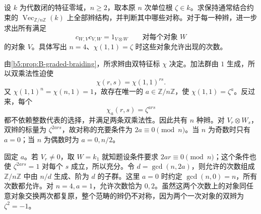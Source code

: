 \begin{exercise}\label{b5:ex:B:14}
	设 \(k\) 为代数闭的特征零域，\(n\ge2\)，取本原 \(n\) 次单位根 \(\zeta\in k\)。求保持通常结合约束的 \(\operatorname{Vec}_{\mathbb Z/n\mathbb Z}(k)\) 上全部辫结构，并判断其中哪些对称。对于每一种辫，进一步求出所有满足
	\[
		c_{W,V}c_{V,W}=1_{V\otimes W}\qquad\text{对每个对象 \(W\)}
	\]
	的对象 \(V\)。具体写出 \(n=4\)、\(\chi(1,1)=\zeta\) 时这些对象允许出现的次数。
\end{exercise}
\begin{solution}
	由\cref{b5:prop:B-graded-braiding}，所求辫由双特征标 \(\chi\) 决定。加法群由 \(1\) 生成，所以双乘法性迫使
	\[
		\chi(r,s)=\chi(1,1)^{rs}.
	\]
	又 \(\chi(1,1)^n=\chi(n,1)=1\)，故存在唯一的 \(a\in\mathbb Z/n\mathbb Z\)，使 \(\chi(1,1)=\zeta^a\)。反过来，每个
	\[
		\chi_a(r,s)=\zeta^{ars}
	\]
	都不依赖整数代表的选择，并满足两条双乘法性。因此共有 \(n\) 种辫。对 \(V_r\otimes W_s\)，双辫的标量为 \(\zeta^{2ars}\)，故对称的充要条件为 \(2a\equiv0\pmod n\)。当 \(n\) 为奇数时只有 \(a=0\)；当 \(n\) 为偶数时为 \(a=0,n/2\)。

	固定 \(a\)。若 \(V_r\ne0\)，取 \(W=k_1\) 就知题设条件要求 \(2ar\equiv0\pmod n\)；这个条件也使 \(\zeta^{2ars}=1\) 对每个 \(s\) 成立，所以充分。令 \(d=\gcd(n,2a)\)，则允许的次数组成 \(\mathbb Z/n\mathbb Z\) 中由 \(n/d\) 生成、阶为 \(d\) 的子群。这里 \(a=0\) 时约定 \(\gcd(n,0)=n\)，所有次数都允许。对 \(n=4,a=1\)，允许次数恰为 \(0,2\)。虽然这两个次数上的对象同任意对象交换两次都复原，整个范畴的辫仍不对称，因为两个一次对象的双辫为 \(\zeta^2=-1\)。
\end{solution}

